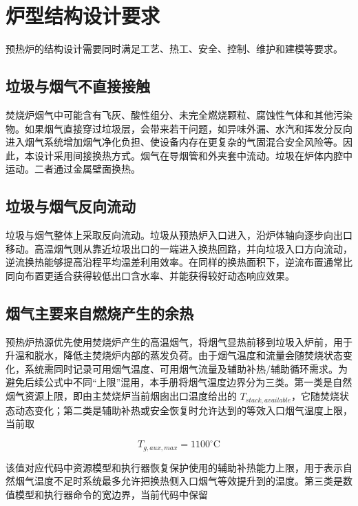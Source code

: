 \documentclass[UTF8,openany,zihao=-4,oneside]{ctexbook}
\begin{document}
\section{炉型结构设计要求}\label{ux7089ux578bux7ed3ux6784ux8bbeux8ba1ux8981ux6c42}

预热炉的结构设计需要同时满足工艺、热工、安全、控制、维护和建模等要求。

\subsection{垃圾与烟气不直接接触}\label{ux5783ux573eux4e0eux70dfux6c14ux4e0dux76f4ux63a5ux63a5ux89e6}

焚烧炉烟气中可能含有飞灰、酸性组分、未完全燃烧颗粒、腐蚀性气体和其他污染物。如果烟气直接穿过垃圾层，会带来若干问题，如异味外漏、水汽和挥发分反向进入烟气系统增加烟气净化负担、使设备内存在更复杂的气固混合安全风险等。因此，本设计采用间接换热方式。烟气在导烟管和外夹套中流动。垃圾在炉体内腔中运动。二者通过金属壁面换热。

\subsection{垃圾与烟气反向流动}\label{ux5783ux573eux4e0eux70dfux6c14ux53cdux5411ux6d41ux52a8}

垃圾与烟气整体上采取反向流动。垃圾从预热炉入口进入，沿炉体轴向逐步向出口移动。高温烟气则从靠近垃圾出口的一端进入换热回路，并向垃圾入口方向流动，逆流换热能够提高沿程平均温差利用效率。在同样的换热面积下，逆流布置通常比同向布置更适合获得较低出口含水率、并能获得较好动态响应效果。

\subsection{烟气主要来自燃烧产生的余热}\label{ux70dfux6c14ux4e3bux8981ux6765ux81eaux71c3ux70e7ux4ea7ux751fux7684ux4f59ux70ed}

预热炉热源优先使用焚烧炉产生的高温烟气，将烟气显热前移到垃圾入炉前，用于升温和脱水，降低主焚烧炉内部的蒸发负荷。由于烟气温度和流量会随焚烧状态变化，系统需同时记录可用烟气温度、可用烟气流量及辅助补热/辅助循环需求。为避免后续公式中不同“上限”混用，本手册将烟气温度边界分为三类。第一类是自然烟气资源上限，即由主焚烧炉当前烟囱出口温度给出的 \(T_{stack,available}\)，它随焚烧状态动态变化；第二类是辅助补热或安全恢复时允许达到的等效入口烟气温度上限，当前取

\[
T_{g,aux,max}=1100^\circ\mathrm{C}
\]

该值对应代码中资源模型和执行器恢复保护使用的辅助补热能力上限，用于表示自然烟气温度不足时系统最多允许把换热侧入口烟气等效提升到的温度。第三类是数值模型和执行器命令的宽边界，当前代码中保留
\end{document}
